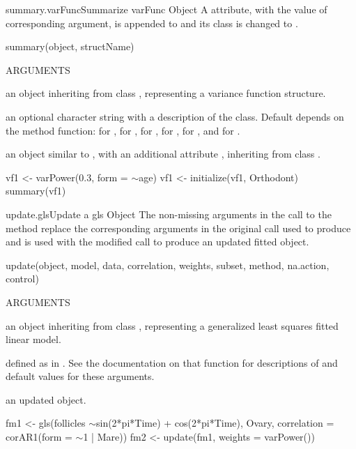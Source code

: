 \documentclass[pdftex]{article} \usepackage{url,graphicx}
\renewcommand{\Twiddle}{\mbox{\(\sim\)}}
\begin{document}
\begin{Helpfile}{summary.varFunc}{Summarize varFunc Object}
A  attribute, with the value of corresponding
argument, is appended to  and its class is changed to
.
\begin{Example}
summary(object, structName)
\end{Example}
\begin{Argument}{ARGUMENTS}
\item[\Co{object:}]
an object inheriting from class ,
representing a variance function structure.
\item[\Co{structName:}]
an optional character string with a description of
the  class. Default depends on the method function:
 for ,
 for ,
 for ,
 for ,
 for , and
 for .
\end{Argument}
an object similar to , with an additional attribute
, inheriting from class .
\need 15pt
\vspace{-16pt} 
\begin{Example}
vf1 <- varPower(0.3, form = \Twiddle age)
vf1 <- initialize(vf1, Orthodont)
summary(vf1)
\end{Example}
\end{Helpfile}
\begin{Helpfile}{update.gls}{Update a gls Object}
The non-missing arguments in the call to the  method
replace the corresponding arguments in the original call used to
produce  and  is used with the modified call to
produce an updated fitted object.
\begin{Example}
update(object, model, data, correlation, weights, subset, method,
       na.action, control)
\end{Example}
\begin{Argument}{ARGUMENTS}
\item[\Co{object:}]
an object inheriting from class , representing
a generalized least squares fitted linear model.
\item[\Co{other arguments:}]
defined as in . See the
documentation on that function for descriptions of and default values
for these arguments.
\end{Argument}
an updated  object.
\need 15pt
\vspace{-16pt} 
\begin{Example}
fm1 <- gls(follicles \Twiddle sin(2*pi*Time) + cos(2*pi*Time), Ovary,
           correlation = corAR1(form = \Twiddle 1 | Mare))
fm2 <- update(fm1, weights = varPower())
\end{Example}
\end{Helpfile}
\end{document}
